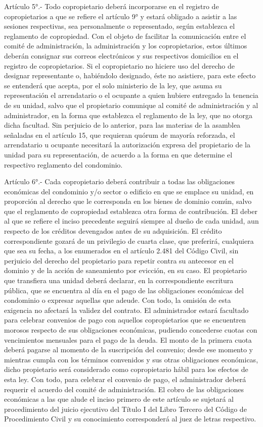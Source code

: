      
    Artículo 5°.- Todo copropietario deberá incorporarse en el registro de copropietarios a que se refiere el artículo 9° y estará obligado a asistir a las sesiones respectivas, sea personalmente o representado, según establezca el reglamento de copropiedad. Con el objeto de facilitar la comunicación entre el comité de administración, la administración y los copropietarios, estos últimos deberán consignar sus correos electrónicos y sus respectivos domicilios en el registro de copropietarios.
    Si el copropietario no hiciere uso del derecho de designar representante o, habiéndolo designado, éste no asistiere, para este efecto se entenderá que acepta, por el solo ministerio de la ley, que asuma su representación el arrendatario o el ocupante a quien hubiere entregado la tenencia de su unidad, salvo que el propietario comunique al comité de administración y al administrador, en la forma que establezca el reglamento de la ley, que no otorga dicha facultad.
    Sin perjuicio de lo anterior, para las materias de la asamblea señaladas en el artículo 15, que requieran quórum de mayoría reforzada, el arrendatario u ocupante necesitará la autorización expresa del propietario de la unidad para su representación, de acuerdo a la forma en que determine el respectivo reglamento del condominio.
   
    Artículo 6°.- Cada copropietario deberá contribuir a todas las obligaciones económicas del condominio y/o sector o edificio en que se emplace su unidad, en proporción al derecho que le corresponda en los bienes de dominio común, salvo que el reglamento de copropiedad establezca otra forma de contribución.
    El deber al que se refiere el inciso precedente seguirá siempre al dueño de cada unidad, aun respecto de los créditos devengados antes de su adquisición. El crédito correspondiente gozará de un privilegio de cuarta clase, que preferirá, cualquiera que sea su fecha, a los enumerados en el artículo 2.481 del Código Civil, sin perjuicio del derecho del propietario para repetir contra su antecesor en el dominio y de la acción de saneamiento por evicción, en su caso.
    El propietario que transfiera una unidad deberá declarar, en la correspondiente escritura pública, que se encuentra al día en el pago de las obligaciones económicas del condominio o expresar aquellas que adeude. Con todo, la omisión de esta exigencia no afectará la validez del contrato.
    El administrador estará facultado para celebrar convenios de pago con aquellos copropietarios que se encuentren morosos respecto de sus obligaciones económicas, pudiendo concederse cuotas con vencimientos mensuales para el pago de la deuda. El monto de la primera cuota deberá pagarse al momento de la suscripción del convenio; desde ese momento y mientras cumpla con los términos convenidos y sus otras obligaciones económicas, dicho propietario será considerado como copropietario hábil para los efectos de esta ley. Con todo, para celebrar el convenio de pago, el administrador deberá requerir el acuerdo del comité de administración.
    El cobro de las obligaciones económicas a las que alude el inciso primero de este artículo se sujetará al procedimiento del juicio ejecutivo del Título I del Libro Tercero del Código de Procedimiento Civil y su conocimiento corresponderá al juez de letras respectivo.

